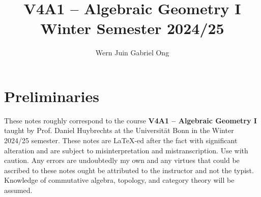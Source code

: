 \documentclass{amsart}
\theoremstyle{definition}
\numberwithin{equation}{section}
\begin{document}
\large
\title[Algebraic Geometry I -- Bonn, Winter 2024/25]{V4A1 -- Algebraic Geometry I \\ Winter Semester 2024/25}
\author{Wern Juin Gabriel Ong}
\address{Universit\"{a}t Bonn, Bonn, D-53113}
\maketitle
\section*{Preliminaries}
These notes roughly correspond to the course \textbf{V4A1 -- Algebraic Geometry I} taught by Prof. Daniel Huybrechts at the Universit\"{a}t Bonn in the Winter 2024/25 semester. These notes are \LaTeX-ed after the fact with significant alteration and are subject to misinterpretation and mistranscription. Use with caution. Any errors are undoubtedly my own and any virtues that could be ascribed to these notes ought be attributed to the instructor and not the typist. Knowledge of commutative algebra, topology, and category theory will be assumed. 
\newpage
\tableofcontents






















\newpage
\printbibliography
\end{document}
